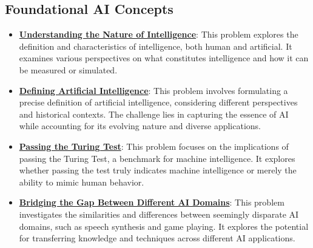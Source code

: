 \documentclass{article}%
\begin{document}
\subsection{Foundational AI Concepts}%
\label{subsec:FoundationalAIConcepts}%
\begin{itemize}[leftmargin=*]%
\item \href{https://purdue.brightspace.com/d2l/common/assets/pdfjs-d2l-dist/1.0.14-legacy/web/viewer.html?file=\%2Fcontent\%2Fenforced\%2F1095467-wl.202510.CS.24300.001\%2F02L2-Intro.pdf\%3Fou\%3D1095467\&lang=en-us\&container=d2l-fileviewer-rendered-pdf\&fullscreen=d2l-fileviewer-rendered-pdf-dialog\&height=667#page=5}{\textbf{Understanding the Nature of Intelligence}}: This problem explores the definition and characteristics of intelligence, both human and artificial. It examines various perspectives on what constitutes intelligence and how it can be measured or simulated.%
\item \href{https://purdue.brightspace.com/d2l/common/assets/pdfjs-d2l-dist/1.0.14-legacy/web/viewer.html?file=\%2Fcontent\%2Fenforced\%2F1095467-wl.202510.CS.24300.001\%2F02L2-Intro.pdf\%3Fou\%3D1095467\&lang=en-us\&container=d2l-fileviewer-rendered-pdf\&fullscreen=d2l-fileviewer-rendered-pdf-dialog\&height=667#page=5}{\textbf{Defining Artificial Intelligence}}: This problem involves formulating a precise definition of artificial intelligence, considering different perspectives and historical contexts. The challenge lies in capturing the essence of AI while accounting for its evolving nature and diverse applications.%
\item \href{https://purdue.brightspace.com/d2l/common/assets/pdfjs-d2l-dist/1.0.14-legacy/web/viewer.html?file=\%2Fcontent\%2Fenforced\%2F1095467-wl.202510.CS.24300.001\%2F02L2-Intro.pdf\%3Fou\%3D1095467\&lang=en-us\&container=d2l-fileviewer-rendered-pdf\&fullscreen=d2l-fileviewer-rendered-pdf-dialog\&height=667#page=6}{\textbf{Passing the Turing Test}}: This problem focuses on the implications of passing the Turing Test, a benchmark for machine intelligence. It explores whether passing the test truly indicates machine intelligence or merely the ability to mimic human behavior.%
\item \href{https://purdue.brightspace.com/d2l/common/assets/pdfjs-d2l-dist/1.0.14-legacy/web/viewer.html?file=\%2Fcontent\%2Fenforced\%2F1095467-wl.202510.CS.24300.001\%2F02L2-Intro.pdf\%3Fou\%3D1095467\&lang=en-us\&container=d2l-fileviewer-rendered-pdf\&fullscreen=d2l-fileviewer-rendered-pdf-dialog\&height=667#page=31}{\textbf{Bridging the Gap Between Different AI Domains}}: This problem investigates the similarities and differences between seemingly disparate AI domains, such as speech synthesis and game playing. It explores the potential for transferring knowledge and techniques across different AI applications.%

\end{itemize}
\end{document}
